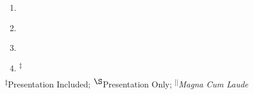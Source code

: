 \begin{center}
\begin{minipage}{1.0\textwidth}
\begin{enumerate}[leftmargin=5mm,itemsep=2mm]
	\item {} \label{useful_prompt}

	\item {} \label{mcnp_efforts}

	\item {} \label{ans_2012_paper}

	\item \textsuperscript{$\ddagger$}   \label{abaqus_2012_paper} 

   \end{enumerate}
\end{minipage}
\end{center}

\footnotesize
\begin{center}
\textsuperscript{$\ddagger$}Presentation Included; \textsuperscript{$\S$}Presentation Only; \textsuperscript{$||$}\textit{Magna Cum Laude}
\end{center}
